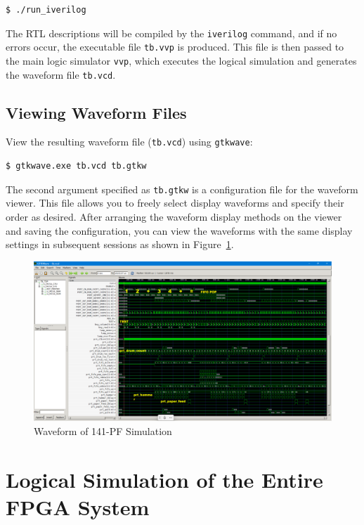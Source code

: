 \begin{verbatim}
$ ./run_iverilog
\end{verbatim}

The RTL descriptions will be compiled by the \texttt{iverilog} command, and if no errors occur, the executable file \texttt{tb.vvp} is produced. This file is then passed to the main logic simulator \texttt{vvp}, which executes the logical simulation and generates the waveform file \texttt{tb.vcd}.

\subsection{Viewing Waveform Files}
View the resulting waveform file (\texttt{tb.vcd}) using \texttt{gtkwave}:
\begin{verbatim}
$ gtkwave.exe tb.vcd tb.gtkw
\end{verbatim}

The second argument specified as \texttt{tb.gtkw} is a configuration file for the waveform viewer. This file allows you to freely select display waveforms and specify their order as desired. After arranging the waveform display methods on the viewer and saving the configuration, you can view the waveforms with the same display settings in subsequent sessions as shown in Figure~\ref{fig:WAVE141PF}.

\begin{figure}[htbp]
  \includegraphics[width=1.0\textwidth]{./Figure/WAVE141PF.png}
  \caption{Waveform of 141-PF Simulation}
  \label{fig:WAVE141PF}
\end{figure}


\section{Logical Simulation of the Entire FPGA System}
